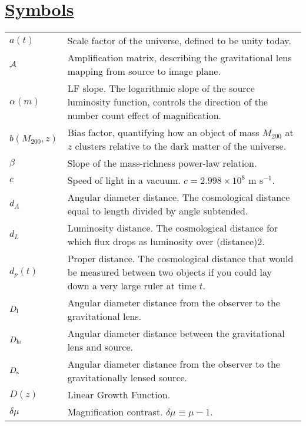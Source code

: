 \section*{\underline{Symbols}}
\begin{tabular}{p{0.6in}p{5.8in}}

$a(t)$ & Scale factor of the universe, defined to be unity today. \\
$\cal{A}$ & Amplification matrix, describing the gravitational lens mapping from source to image plane. \\
$\alpha(m)$ & \acs{LF} slope. The logarithmic slope of the source luminosity function, controls the direction of the number count effect of magnification. \\
$b(M_{200},z)$ & Bias factor, quantifying how an object of mass $M_{200}$ at $z$ clusters relative to the dark matter of the universe. \\ 
$\beta$ & Slope of the mass-richness power-law relation. \\
$c$ & Speed of light in a vacuum. $c = 2.998 \times 10^8$ m s$^{-1}$. \\
$d_A$ & Angular diameter distance. The cosmological distance equal to length divided by angle subtended. \\
$d_L$ & Luminosity distance. The cosmological distance for which flux drops as luminosity over (distance)$2$. \\
$d_p(t)$ & Proper distance. The cosmological distance that would be measured between two objects if you could lay down a very large ruler at time $t$. \\
$D_{\rm l}$ & Angular diameter distance from the observer to the gravitational lens. \\
$D_{\rm ls}$ & Angular diameter distance between the gravitational lens and source. \\
$D_{\rm s}$ & Angular diameter distance from the observer to the gravitationally lensed source. \\
$D(z)$ & Linear Growth Function. \\
$\delta\mu$ & Magnification contrast. $\delta\mu \equiv \mu -1$. \\

\end{tabular}
